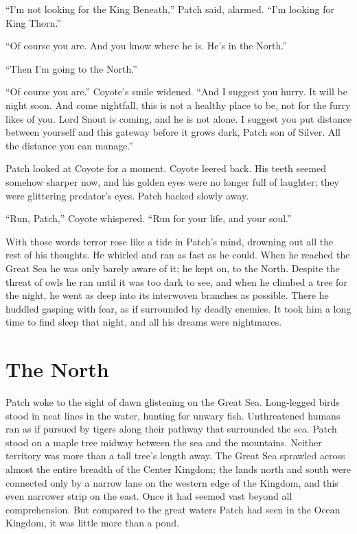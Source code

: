 \documentclass[12pt]{memoir}
\begin{document}
“I’m not looking for the King Beneath,” Patch said, alarmed. “I’m
looking for King Thorn.”

“Of course you are. And you know where he is. He’s in the North.”

“Then I’m going to the North.”

“Of course you are.” Coyote’s smile widened. “And I suggest you
hurry. It will be night soon. And come nightfall, this is not a
healthy place to be, not for the furry likes of you. Lord Snout is
coming, and he is not alone. I suggest you put distance between
yourself and this gateway before it grows dark, Patch son of
Silver. All the distance you can manage.”

Patch looked at Coyote for a moment. Coyote leered back. His teeth
seemed somehow sharper now, and his golden eyes were no longer full of
laughter; they were glittering predator’s eyes. Patch backed slowly
away.

“Run, Patch,” Coyote whispered. “Run for your life, and your soul.”

With those words terror rose like a tide in Patch’s mind, drowning out
all the rest of his thoughts. He whirled and ran as fast as he
could. When he reached the Great Sea he was only barely aware of it;
he kept on, to the North. Despite the threat of owls he ran until it
was too dark to see, and when he climbed a tree for the night, he went
as deep into its interwoven branches as possible. There he huddled
gasping with fear, as if surrounded by deadly enemies. It took him a
long time to find sleep that night, and all his dreams were
nightmares.


\section{The North}

Patch woke to the sight of dawn glistening on the Great
Sea. Long-legged birds stood in neat lines in the water, hunting for
unwary fish. Unthreatened humans ran as if pursued by tigers along
their pathway that surrounded the sea. Patch stood on a maple tree
midway between the sea and the mountains. Neither territory was more
than a tall tree’s length away. The Great Sea sprawled across almost
the entire breadth of the Center Kingdom; the lands north and south
were connected only by a narrow lane on the western edge of the
Kingdom, and this even narrower strip on the east. Once it had seemed
vast beyond all comprehension. But compared to the great waters Patch
had seen in the Ocean Kingdom, it was little more than a pond.
\end{document}
